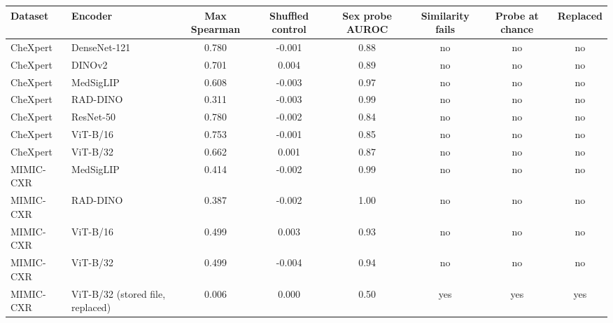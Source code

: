 \begin{tabular}{llcccccc}
\toprule
Dataset & Encoder & Max Spearman & Shuffled control & Sex probe AUROC & Similarity fails & Probe at chance & Replaced \\
\midrule
CheXpert & DenseNet-121 & 0.780 & -0.001 & 0.88 & no & no & no \\
CheXpert & DINOv2 & 0.701 & 0.004 & 0.89 & no & no & no \\
CheXpert & MedSigLIP & 0.608 & -0.003 & 0.97 & no & no & no \\
CheXpert & RAD-DINO & 0.311 & -0.003 & 0.99 & no & no & no \\
CheXpert & ResNet-50 & 0.780 & -0.002 & 0.84 & no & no & no \\
CheXpert & ViT-B/16 & 0.753 & -0.001 & 0.85 & no & no & no \\
CheXpert & ViT-B/32 & 0.662 & 0.001 & 0.87 & no & no & no \\
MIMIC-CXR & MedSigLIP & 0.414 & -0.002 & 0.99 & no & no & no \\
MIMIC-CXR & RAD-DINO & 0.387 & -0.002 & 1.00 & no & no & no \\
MIMIC-CXR & ViT-B/16 & 0.499 & 0.003 & 0.93 & no & no & no \\
MIMIC-CXR & ViT-B/32 & 0.499 & -0.004 & 0.94 & no & no & no \\
MIMIC-CXR & ViT-B/32 (stored file, replaced) & 0.006 & 0.000 & 0.50 & yes & yes & yes \\
\bottomrule
\end{tabular}
